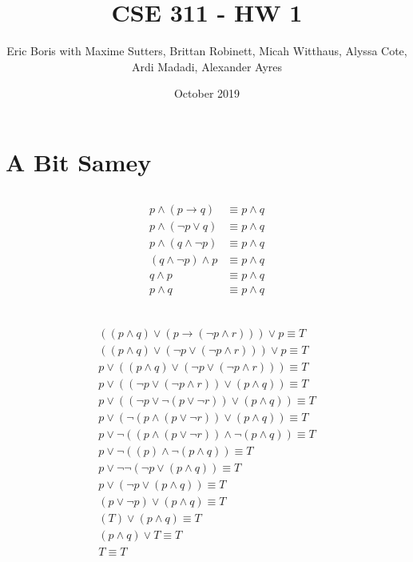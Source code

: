 \documentclass[11pt]{article}
\title{CSE 311 - HW 1}
\author{Eric Boris \newline with Maxime Sutters, Brittan Robinett, Micah Witthaus, Alyssa Cote, Ardi Madadi, Alexander Ayres}
\date{October 2019}
\makeatletter
\renewcommand{\maketitle}{\bgroup\setlength{\parindent}{0pt}
\begin{flushleft}
  \textbf{\@title}

  \@author
  
  \@date
\end{flushleft}\egroup
}
\makeatother
\begin{document}
\maketitle

\section{A Bit Samey} %
\subsection{} %
\begin{align*}
	p \land (p \rightarrow q) &\equiv p \land q \\
	p \land (\neg{p} \lor q) &\equiv p \land q \tag*{Law of Implication} \\
	p \land (q \land \neg{p}) &\equiv p \land q \tag*{Commutativity} \\
	(q \land \neg{p}) \land p  &\equiv p \land q \tag*{Commutativity} \\
	q \land p  &\equiv p \land q \tag*{Absorbtion} \\
	p \land q  &\equiv p \land q \tag*{Commutativity} \\
\end{align*}

\subsection{} %
\begin{align*}
	((p \land q) \lor (p \rightarrow (\neg{p} \land r))) \lor p \equiv T \\
	((p \land q) \lor (\neg{p} \lor (\neg{p} \land r))) \lor p \equiv T \tag*{Law of Implication} \\
	p \lor ((p \land q) \lor (\neg{p} \lor (\neg{p} \land r))) \equiv T \tag*{Commutativity} \\
	p \lor ((\neg{p} \lor (\neg{p} \land r)) \lor (p \land q)) \equiv T \tag*{Commutativity} \\
	p \lor ((\neg{p} \lor \neg{(p \lor \neg{r})}) \lor (p \land q)) \equiv T \tag*{De Morgan's} \\
	p \lor (\neg{(p \land (p \lor \neg{r}))} \lor (p \land q)) \equiv T \tag*{De Morgan's} \\
	p \lor \neg{((p \land (p \lor \neg{r})) \land \neg{(p \land q)})} \equiv T \tag*{De Morgan's} \\
	p \lor \neg{((p) \land \neg{(p \land q)})} \equiv T \tag*{Absorbtion} \\
	p \lor \neg{\neg{(\neg{p} \lor (p \land q))}} \equiv T \tag*{De Morgan's} \\
	p \lor (\neg{p} \lor (p \land q)) \equiv T \tag*{Double Negation} \\
	(p \lor \neg{p}) \lor (p \land q) \equiv T \tag*{Associativity} \\
	(T) \lor (p \land q) \equiv T \tag*{Negation} \\
	(p \land q) \lor T \equiv T \tag*{Commutativity} \\
	T \equiv T \tag*{Domination} \\
\end{align*}
\end{document}
